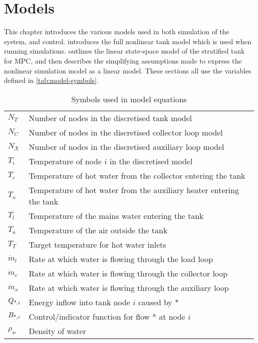 \chapter{Models}
\label{ch:models}

This chapter introduces the various models used in both simulation of the system, and control.
 introduces the full nonlinear tank model which is used when running simulations.
 outlines the linear state-space model of the stratified tank for MPC, and then describes the simplifying assumptions made to express the nonlinear simulation model as a linear model.
These sections all use the variables defined in \autoref{tab:model-symbols}.

\begin{table}
   \caption{Symbols used in model equations}
   \label{tab:model-symbols}
   \begin{center}
   \begin{tabular}{l l}
      \toprule
      $N_T$ & Number of nodes in the discretised tank model \\
      $N_C$ & Number of nodes in the discretised collector loop model \\
      $N_X$ & Number of nodes in the discretised auxiliary loop model \\
      $T_i$ & Temperature of node $i$ in the discretised model \\
      $T_c$ & Temperature of hot water from the collector entering the tank \\
      $T_x$ & Temperature of hot water from the auxiliary heater entering the tank \\
      $T_l$ & Temperature of the mains water entering the tank \\
      $T_a$ & Temperature of the air outside the tank \\
      $T_T$ & Target temperature for hot water inlets \\
      $\dot{m}_l$ & Rate at which water is flowing through the load loop \\
      $\dot{m}_c$ & Rate at which water is flowing through the collector loop\\
      $\dot{m}_x$ & Rate at which water is flowing through the auxiliary loop\\
      $Q_{\text{*}, i}$ & Energy inflow into tank node $i$ caused by * \\
      $B_{\text{*}, i}$ & Control/indicator function for flow * at node $i$ \\
      $\rho_w$ & Density of water \\

\end{tabular}
\end{center}
\end{table}
